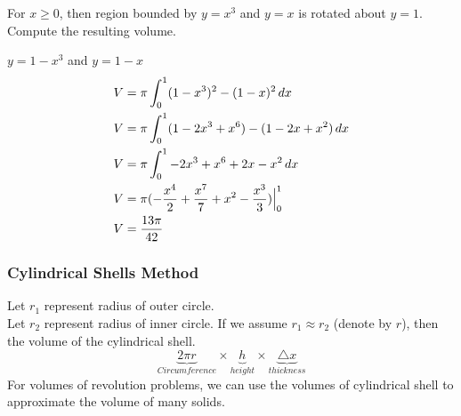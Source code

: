 \documentclass[english, 12pt]{article}
\begin{document}
\begin{exmp}
For $x \geq 0$, then region bounded by $y=x^3$ and $y=x$ is rotated about $y=1$. Compute the resulting volume.
\begin{sol}
$y=1-x^3$ and $y=1-x$
\begin{align*}
& V = \pi \int_0^1 (1-x^3)^2 -  (1-x)^2\,dx\\
& V = \pi \int_0^1 (1-2x^3+x^6) - (1-2x+x^2)\,dx\\
& V = \pi \int_0^1 -2x^3+x^6 +2x-x^2\,dx\\
& V = \pi (- \frac{x^4}{2} + \frac{x^7}{7} + x^2 - \frac{x^3}{3})\Big|_0^1\\
& V = \frac{13 \pi}{42}
\end{align*}
\end{sol}
\end{exmp}
\subsubsection{Cylindrical Shells Method}
Let $r_{1}$ represent radius of outer circle.\\
Let $r_{2}$ represent radius of inner circle.
If we assume $r_{1} \approx r_{2}$ (denote by $r$), then the volume of the cylindrical shell.
\[ \underbrace{2\pi r}_{Circumference}\times  \underbrace{h}_{height} \times  \underbrace{\triangle x}_{thickness} \]
For volumes of revolution problems, we can use the volumes of cylindrical shell to approximate the volume of many solids.
\end{document}
